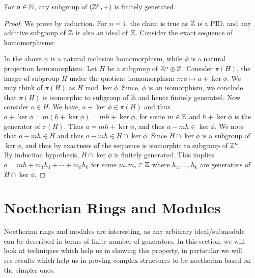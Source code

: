 \documentclass[11pt]{article}
\begin{document}
\begin{lemma}\label{lem:zn-noetherian}
For $n\in \mathbb{N}$, any subgroup of $(\mathbb{Z}^n,+)$ is finitely generated.
\end{lemma}
\begin{proof}
We prove by induction. For $n=1$, the claim is true as $\mathbb{Z}$ is a PID, and any additive subgroup of $\mathbb{Z}$ is
also an ideal of $\mathbb{Z}$. Consider the exact sequence of homomorphisms:

In the above $\psi$ is a natural inclusion homomorphism, while $\phi$ is a natural projection homomorphism. Let
$H$ be a subgroup of $\mathbb{Z}^n\oplus \mathbb{Z}$. Consider $\pi(H)$, the image of subgroup $H$ under the quotient homomorphism
$\pi: a \mapsto a + \ker{\phi}$. We may think of $\pi(H)$ as $H \textrm{ mod } \ker{\phi}$. Since, $\bar{\phi}$
is an isomorphism, we conclude that $\pi(H)$ is isomorphic to subgroup of $\mathbb{Z}$ and hence finitely generated.
Now consider $a\in H$. We have,
$a+\ker{\phi}\in \pi(H)$ and thus $a+\ker{\phi} = m(h+\ker{\phi})= mh+\ker{\phi}$, for some $m\in \mathbb{Z}$ and
$h+\ker{\phi}$ is the generator of $\pi(H)$. Thus $a=mh + \ker{\phi}$, and thus $a-mh\in \ker{\phi}$. We note
that $a-mh\in H$ and thus $a-mh\in H\cap \ker{\phi}$. Since $H\cap \ker{\phi}$ is a subgroup of $\ker{\phi}$,
and thus by exactness of the sequence is isomorphic to subgroup of $\mathbb{Z}^n$. By induction hypothesis,
$H\cap \ker{\phi}$ is finitely generated. This implies $a=mh + m_1 h_1 + \cdots + m_k h_k$ for some $m,m_i\in \mathbb{Z}$
where $h_1,\ldots,h_k$ are generators of $H\cap \ker{\phi}$.
\end{proof}

\section{Noetherian Rings and Modules}\label{sec:noetherian-rings-modules}
Noetherian rings and modules are interesting, as any arbitrary ideal/submodule can be described in terms of
finite number of generators. In this section, we will look at techniques which help us in showing this property,
in particular we will see results which help us in proving complex structures to be noetherian based on the
simpler ones.
\end{document}
